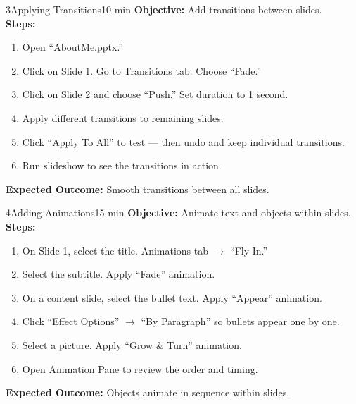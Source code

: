 \begin{labactivity}{3}{Applying Transitions}{10 min}
\textbf{Objective:} Add transitions between slides.\\[4pt]
\textbf{Steps:}
\begin{enumerate}[label=\protect\stepcircle{\arabic*}, leftmargin=2cm, itemsep=4pt]
  \item Open ``AboutMe.pptx.''
  \item Click on Slide 1. Go to Transitions tab. Choose ``Fade.''
  \item Click on Slide 2 and choose ``Push.'' Set duration to 1 second.
  \item Apply different transitions to remaining slides.
  \item Click ``Apply To All'' to test --- then undo and keep individual transitions.
  \item Run slideshow to see the transitions in action.
\end{enumerate}
\textbf{Expected Outcome:} Smooth transitions between all slides.
\welldone
\end{labactivity}

\begin{labactivity}{4}{Adding Animations}{15 min}
\textbf{Objective:} Animate text and objects within slides.\\[4pt]
\textbf{Steps:}
\begin{enumerate}[label=\protect\stepcircle{\arabic*}, leftmargin=2cm, itemsep=4pt]
  \item On Slide 1, select the title. Animations tab $\rightarrow$ ``Fly In.''
  \item Select the subtitle. Apply ``Fade'' animation.
  \item On a content slide, select the bullet text. Apply ``Appear'' animation.
  \item Click ``Effect Options'' $\rightarrow$ ``By Paragraph'' so bullets appear one by one.
  \item Select a picture. Apply ``Grow \& Turn'' animation.
  \item Open Animation Pane to review the order and timing.
\end{enumerate}
\textbf{Expected Outcome:} Objects animate in sequence within slides.
\welldone
\end{labactivity}

